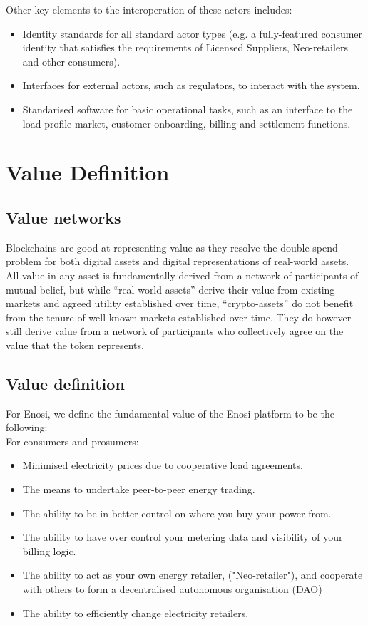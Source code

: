 \documentclass{article}
\theoremstyle{definition}
\theoremstyle{plain} %
\begin{document}
Other key elements to the interoperation of these actors includes:

\begin{itemize}
\item{ Identity standards for all standard actor types (e.g. a fully-featured consumer identity that satisfies the requirements of Licensed Suppliers, Neo-retailers and other consumers).}
\item{ Interfaces for external actors, such as regulators, to interact with the system. }
\item{ Standarised software for basic operational tasks, such as an interface to the load profile market, customer onboarding, billing and settlement functions.}
\end{itemize}



\pagebreak
\section{Value Definition}

\subsection{Value networks}

Blockchains are good at representing value as they resolve the double-spend problem for both digital assets and digital representations of real-world assets. All value in any asset is fundamentally derived from a network of participants of mutual belief, but while “real-world assets” derive their value from existing markets and agreed utility established over time, “crypto-assets” do not benefit from the tenure of well-known markets established over time. They do however still derive value from a network of participants who collectively agree on the value that the token represents.

\subsection{Value definition}

For Enosi, we define the fundamental value of the Enosi platform to be the following:\\

\noindent For consumers and prosumers:

\begin{itemize}
\item{Minimised electricity prices due to cooperative load agreements.}
\item{The means to undertake peer-to-peer energy trading.}
\item{The ability to be in better control on where you buy your power from.}
\item{The ability to have  over control your metering data and visibility of your billing logic.}
\item{The ability to act as your own energy retailer, ("Neo-retailer"), and cooperate with others to form a decentralised autonomous organisation (DAO)}
\item{The ability to efficiently change electricity retailers.\\}
\end{itemize}
\end{document}
